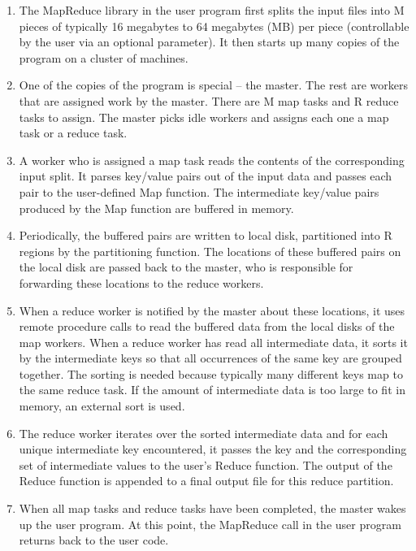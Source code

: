 \documentclass[
]{article}
\begin{document}
\begin{enumerate}
\def\labelenumi{\arabic{enumi}.}
\item
  The MapReduce library in the user program first splits the input files
  into M pieces of typically 16 megabytes to 64 megabytes (MB) per piece
  (controllable by the user via an optional parameter). It then starts
  up many copies of the program on a cluster of machines.\\
\item
  One of the copies of the program is special -- the master. The rest
  are workers that are assigned work by the master. There are M map
  tasks and R reduce tasks to assign. The master picks idle workers and
  assigns each one a map task or a reduce task.\\
\item
  A worker who is assigned a map task reads the contents of the
  corresponding input split. It parses key/value pairs out of the input
  data and passes each pair to the user-defined Map function. The
  intermediate key/value pairs produced by the Map function are buffered
  in memory.\\
\item
  Periodically, the buffered pairs are written to local disk,
  partitioned into R regions by the partitioning function. The locations
  of these buffered pairs on the local disk are passed back to the
  master, who is responsible for forwarding these locations to the
  reduce workers.\\
\item
  When a reduce worker is notified by the master about these locations,
  it uses remote procedure calls to read the buffered data from the
  local disks of the map workers. When a reduce worker has read all
  intermediate data, it sorts it by the intermediate keys so that all
  occurrences of the same key are grouped together. The sorting is
  needed because typically many different keys map to the same reduce
  task. If the amount of intermediate data is too large to fit in
  memory, an external sort is used.\\
\item
  The reduce worker iterates over the sorted intermediate data and for
  each unique intermediate key encountered, it passes the key and the
  corresponding set of intermediate values to the user's Reduce
  function. The output of the Reduce function is appended to a final
  output file for this reduce partition.
\item
  When all map tasks and reduce tasks have been completed, the master
  wakes up the user program. At this point, the MapReduce call in the
  user program returns back to the user code.
\end{enumerate}
\end{document}
